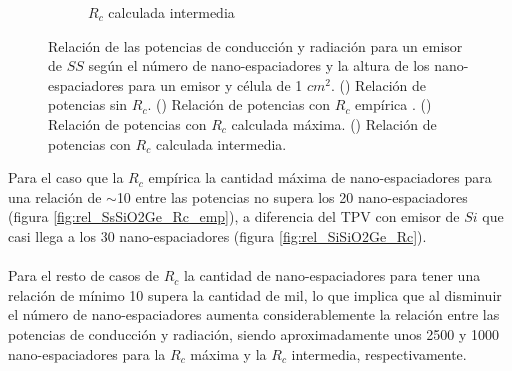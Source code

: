 \begin{figure}[H]
\begin{subfigure}[b]{0.49\textwidth}
		\caption{$R_c$ calculada intermedia}
		\label{fig:rel_SsSiO2Ge_Rc_inter}
	\end{subfigure}
	\caption[Relación de las potencias de conducción y radiación para un emisor de $SS$ según el número de nano-espaciadores y la altura de los nano-espaciadores para un emisor y célula de 1 $cm^2$]{Relación de las potencias de conducción y radiación para un emisor de $SS$ según el número de nano-espaciadores y la altura de los nano-espaciadores para un emisor y célula de 1 $cm^2$. () Relación de potencias sin $R_c$. () Relación de potencias con $R_c$ empírica \cite{nf_TPV_Pillars_SiO2}. () Relación de potencias con $R_c$ calculada máxima. () Relación de potencias con $R_c$ calculada intermedia. }
	\label{fig:relation_SsSiO2Ge}
\end{figure}
Para el caso que la $R_c$ empírica la cantidad máxima de nano-espaciadores para una relación de $\sim$10 entre las potencias no supera los 20 nano-espaciadores (figura \ref{fig:rel_SsSiO2Ge_Rc_emp}), a diferencia del TPV con emisor de $Si$ que casi llega a los 30 nano-espaciadores (figura \ref{fig:rel_SiSiO2Ge_Rc}).\\\\
Para el resto de casos de $R_c$ la cantidad de nano-espaciadores para tener una relación de mínimo 10 supera la cantidad de mil, lo que implica que al disminuir el número de nano-espaciadores aumenta considerablemente la relación entre las potencias de conducción y radiación, siendo aproximadamente unos 2500 y 1000 nano-espaciadores para la $R_c$ máxima y la $R_c$ intermedia, respectivamente.

